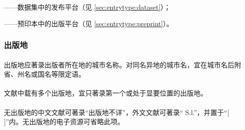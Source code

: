 \documentclass[twoside]{article}%
\begin{document}
——数据集中的发布平台（见 \ref{sec:entrytype:dataset}）；

——预印本中的出版平台（见 \ref{sec:entrytype:preprint}）。

\begin{refsection}
\nocite{egbookpuba--}
\nocite{egbookpubb--}
\nocite{egbookpubc--}
\nocite{egbookpube--}
{}
\end{refsection}

\subsubsection{出版地}

\paragraph{}\label{sec:addr:city} 出版地应著录出版者所在地的城市名称。对同名异地的城市名，宜在城市名后附省、州名或国名等限定语。

\begin{refsection}
\togglefalse{bbx:gbpub}
\nocite{egbookpubaddressa--}
\nocite{egbookpubaddressb--}
\nocite{egbookpubaddressc--}
\nocite{egbookpubaddressd--}


{}
\end{refsection}


\paragraph{} 文献中载有多个出版地，宜只著录第一个或处于显要位置的出版地。

\begin{refsection}
\nocite{egbookpubaddressca--}
\nocite{egbookpubaddressda--}


{}
\end{refsection}

\paragraph{}\label{sec:place:no} 无出版地的中文文献可著录“出版地不详”，外文文献可著录“ S.l.”，并置于“[ ]”内。无出版地的电子资源可省略此项。
\end{document}
